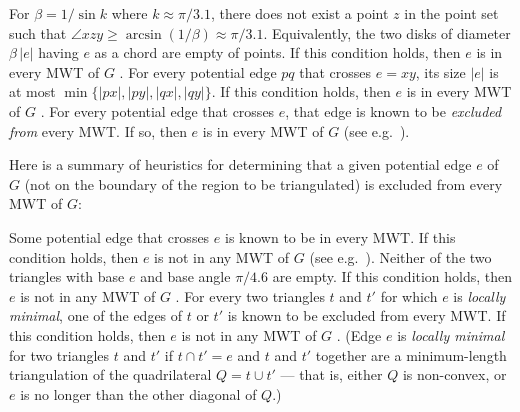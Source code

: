 \documentclass[final]{siamltex}
\renewcommand{\overline}[1]{{#1}}
\newcommand{\edge}{e}
\newcommand{\graph}{G}
\newcommand{\tri}{t}  \newcommand{\vertex}{v}
\newcommand{\YXY}{YXY\xspace}
\begin{document}
\begin{description}
  {
    For $\beta = 1/\sin k $ where $k \approx \pi/3.1$,
    there does not exist a point $z$
    in the point set such that $\angle x z y \ge \arcsin(1/\beta) \approx \pi/3.1$.
    Equivalently, 
    the two disks of diameter $\beta\,|\edge|$ having $\edge$ as a chord are empty
    of points.
    If this condition holds, then $e$ is in every MWT of $G$
    \cite{keil1994computing,cheng1996approaching}.
  }
  \thing{$\YXY$-subgraph:}
  {
For every potential edge $\overline{p q}$ that crosses $\edge=\overline{x y}$,
    its size $|\edge|$ is at most $\min\{|\overline{p x}|,|\overline{p y}|,|\overline{q x}|,|\overline{q y}|\}$.
    If this condition holds, then $e$ is in every MWT of $G$
    \cite{yang1994chain,gilbert1979new}.
  }
  {
    For every potential edge that crosses $\edge$, that edge is known to be {\em excluded from} every MWT.
    If so, then $e$ is in every MWT of $G$
    (see e.g.~\cite{dickerson1997large}).
  }
\end{description}
\smallskip

Here is a summary of heuristics for determining that 
a given potential edge $\edge$ of $\graph$ 
(not on the boundary of the region to be triangulated) 
is excluded from every MWT of $\graph$:

\begin{description}
  {
  Some potential edge that crosses $\edge$ is known to be in every MWT.
  If this condition holds, then $e$ is not in any MWT of $G$
  (see e.g.~\cite{dickerson1997large}).
  }
  {
  Neither of the two triangles with base $\edge$ and base angle $\pi/4.6$ are empty.
  If this condition holds, then $e$ is not in any MWT of $G$
  \cite{das1989triangulations,drysdale2001exclusion}.
  }
  {
    For every two triangles $\tri$ and $\tri'$ for which $\edge$ is {\em locally minimal},
    one of the edges of $\tri$ or $\tri'$ is known to be excluded from every MWT.
    If this condition holds, then $e$ is not in any MWT of $G$
    \cite{dickerson1997large}.
    (Edge $\edge$ is {\em locally minimal} 
    for two triangles $\tri$ and $\tri'$
    if $\tri\cap \tri' = \edge$ and
    $\tri$ and $\tri'$ together are a minimum-length triangulation of 
the quadrilateral $Q = \tri\cup \tri'$ ---
    that is, either $Q$ is non-convex,
    or $\edge$ is no longer than the other diagonal of $Q$.)
  }
\end{description}
\smallskip
\end{document}
